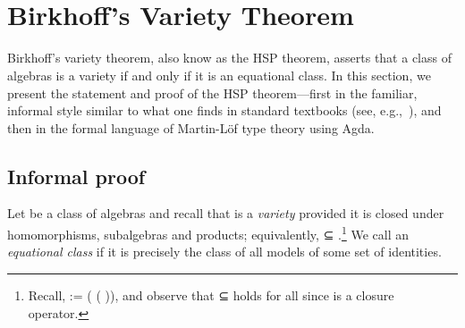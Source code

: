 \begin{code}%
\>[0]\<%
\\
%
\>[1]\AgdaSpace{}%
\AgdaSymbol{:}\AgdaSpace{}%
\AgdaSpace{}%
\AgdaSpace{}%
\AgdaSpace{}%
\AgdaSymbol{(}\AgdaSpace{}%
\AgdaSymbol{(}\AgdaSpace{}%
\AgdaSpace{}%
\AgdaSpace{}%
\AgdaSymbol{))}\AgdaSpace{}%
\AgdaSpace{}%
\AgdaSpace{}%
\AgdaOperator{\AgdaFunction{𝔽[}}\AgdaSpace{}%
\AgdaSpace{}%
\AgdaOperator{\AgdaFunction{]}}\AgdaSpace{}%
\AgdaSymbol{(}\AgdaSpace{}%
\AgdaSpace{}%
\AgdaSpace{}%
\AgdaSymbol{)}\<%
\\
%
\>[1]\AgdaSpace{}%
\AgdaSpace{}%
\AgdaSymbol{=}\AgdaSpace{}%
\AgdaSpace{}%
\AgdaSymbol{(}\AgdaSpace{}%
\AgdaSpace{}%
\AgdaSymbol{\{}\AgdaSpace{}%
\AgdaSymbol{\}}\AgdaSpace{}%
\AgdaSpace{}%
\AgdaSymbol{\{}\AgdaSpace{}%
\AgdaSymbol{=}\AgdaSpace{}%
\AgdaSymbol{\}\{}\AgdaSymbol{\}))}\AgdaSpace{}%
\<%
\end{code}
\fi



\section{Birkhoff's Variety Theorem}

Birkhoff's variety theorem, also know as the HSP theorem, asserts that a class of algebras
is a variety if and only if it is an equational class.  In this section, we present the
statement and proof of the HSP theorem---first in the familiar, informal style similar to
what one finds in standard textbooks (see, e.g.,~\cite[Theorem 4.41]{Bergman:2012}),
and then in the formal language of Martin-Löf type theory using Agda.

\subsection{Informal proof}
Let  be a class of algebras and recall that  is a \emph{variety} provided
\ifshort\else
it is closed under homomorphisms, subalgebras and products; equivalently,
\fi
{}  ⊆ .\footnote{Recall,   :=  ( ( )),
and observe that  ⊆   holds for all  since
 is a closure operator.}
We call  an \emph{equational class} if it is precisely the class of all models of some set of identities.

